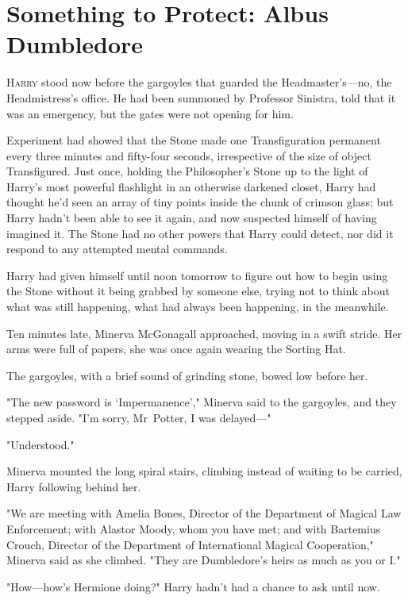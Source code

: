\chapter{Something to Protect: Albus Dumbledore}

\lettrine{H}{arry} stood now
before the gargoyles that guarded the Headmaster's---no, the Headmistress's
office. He had been summoned by Professor Sinistra, told that it was an
emergency, but the gates were not opening for him.

Experiment had showed that the Stone made one Transfiguration permanent every
three minutes and fifty-four seconds, irrespective of the size of object
Transfigured. Just once, holding the Philosopher's Stone up to the light of
Harry's most powerful flashlight in an otherwise darkened closet, Harry had
thought he'd seen an array of tiny points inside the chunk of crimson glass;
but Harry hadn't been able to see it again, and now suspected himself of having
imagined it. The Stone had no other powers that Harry could detect, nor did it
respond to any attempted mental commands.

Harry had given himself until noon tomorrow to figure out how to begin using
the Stone without it being grabbed by someone else, trying not to think about
what was still happening, what had always been happening, in the meanwhile.

Ten minutes late, Minerva McGonagall approached, moving in a swift stride. Her
arms were full of papers, she was once again wearing the Sorting Hat.

The gargoyles, with a brief sound of grinding stone, bowed low before her.

"The new password is `Impermanence'," Minerva said to the gargoyles, and they
stepped aside. "I'm sorry, Mr~Potter, I was delayed---"

"Understood."

Minerva mounted the long spiral stairs, climbing instead of waiting to be
carried, Harry following behind her.

"We are meeting with Amelia Bones, Director of the Department of Magical Law
Enforcement; with Alastor Moody, whom you have met; and with Bartemius Crouch,
Director of the Department of International Magical Cooperation," Minerva said
as she climbed. "They are Dumbledore's heirs as much as you or I."

"How---how's Hermione doing?" Harry hadn't had a chance to ask until now.

